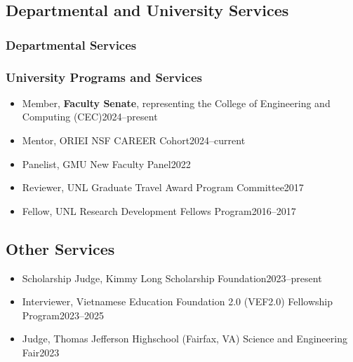 \documentclass[11pt]{article}
\newcommand{\beforegmu}{\begin{center}\rule{2in}{0.8pt}~\textbf{Before GMU}~\rule{2in}{0.8pt}\end{center}}
\begin{document}
\subsection{Departmental and University Services}
\subsubsection{Departmental Services}

\myunitservices{}


\subsubsection{University Programs and Services}
\begin{itemize}
    \item Member, \textbf{Faculty Senate}, representing the College of Engineering and Computing (CEC)\hfill 2024--present
    \item Mentor, ORIEI NSF CAREER Cohort\hfill 2024--current
    \item Panelist, GMU New Faculty Panel\hfill 2022
    \item Reviewer,  UNL Graduate Travel Award Program Committee\hfill 2017
    \item Fellow, UNL Research Development Fellows Program\hfill 2016--2017
\end{itemize}


\subsection{Other Services}
\begin{itemize}
    \item Scholarship Judge, Kimmy Long Scholarship Foundation\hfill 2023--present    
    \item  Interviewer, Vietnamese Education Foundation 2.0 (VEF2.0) Fellowship Program\hfill 2023--2025
    \item Judge, Thomas Jefferson Highschool (Fairfax, VA) Science and Engineering Fair\hfill 2023
\end{itemize}
\end{document}
